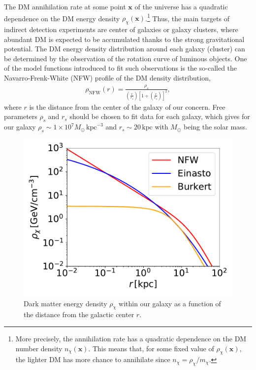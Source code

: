 \documentclass[12pt,twoside,book]{article}
\begin{document}
The DM annihilation rate at some point $\bm{x}$ of the universe has a quadratic dependence on the DM energy density $\rho_\chi (\bm{x})$.\footnote{
  More precisely, the annihilation rate has a quadratic dependence on the DM number density $n_\chi (\bm{x})$.
  This means that, for some fixed value of $\rho_\chi (\bm{x})$, the lighter DM has more chance to annihilate since $n_\chi = \rho_\chi / m_\chi$.
}
Thus, the main targets of indirect detection experiments are center of galaxies or galaxy clusters, where abundant DM is expected to be accumulated thanks to the strong gravitational potential.
The DM energy density distribution around each galaxy (cluster) can be determined by the observation of the rotation curve of luminous objects.
One of the model functions introduced to fit such observations is the so-called the Navarro-Frenk-White (NFW) profile \cite{Navarro:1995iw, Navarro:1996gj} of the DM density distribution,
\begin{align}
  \rho_{\mathrm{NFW}} (r) = \frac{\rho_s}
  { \left( \frac{r}{r_s} \right) \left[ 1 + \left( \frac{r}{r_s} \right) \right]^2},
\end{align}
where $r$ is the distance from the center of the galaxy of our concern.
Free parameters $\rho_s$ and $r_s$ should be chosen to fit data for each galaxy, which gives for our galaxy $\rho_s \sim 1\times 10^7 M_\odot\, \mathrm{kpc}^{-3}$ and $r_s \sim 20\,\mathrm{kpc}$ \cite{Fornasa:2013iaa} with $M_\odot$ being the solar mass.

\begin{figure}
  \centering
  \includegraphics[width=0.5\hsize]{profile.pdf}
  \caption{
    Dark matter energy density $\rho_\chi$ within our galaxy as a function of the distance from the galactic center $r$.
  }
  \label{fig:profile}
\end{figure}
\end{document}
